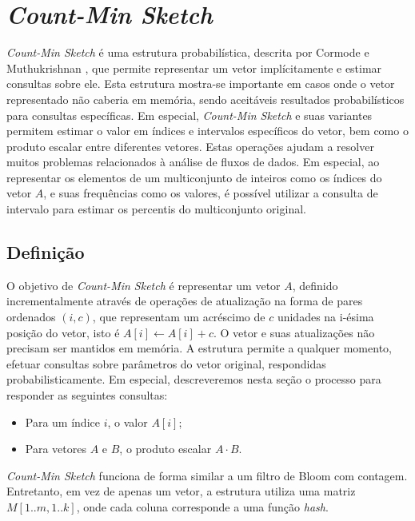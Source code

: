 \section{\emph{Count-Min Sketch}}\label{sec:countmin}

\emph{Count-Min Sketch} é uma estrutura probabilística, descrita por Cormode e Muthukrishnan \cite{cormode2005improved}, que permite representar um vetor implícitamente e estimar consultas sobre ele. Esta estrutura mostra-se importante em casos onde o vetor representado não caberia em memória, sendo aceitáveis resultados probabilísticos para consultas específicas. Em especial, \emph{Count-Min Sketch} e suas variantes permitem estimar o valor em índices e intervalos específicos do vetor, bem como o produto escalar entre diferentes vetores. Estas operações ajudam a resolver muitos problemas relacionados à análise de fluxos de dados. Em especial, ao representar os elementos de um multiconjunto de inteiros como os índices do vetor $A$, e suas frequências como os valores, é possível utilizar a consulta de intervalo para estimar os percentis do multiconjunto original.

\subsection{Definição}


O objetivo de \emph{Count-Min Sketch} é representar um vetor $A$,  definido incrementalmente através de operações de atualização na forma de pares ordenados $(i, c)$, que representam um acréscimo de $c$ unidades na i-ésima posição do vetor, isto é $A[i] \gets A[i] + c$. O vetor e suas atualizações não precisam ser mantidos em memória. A estrutura permite a qualquer momento, efetuar consultas sobre parâmetros do vetor original, respondidas probabilisticamente. Em especial, descreveremos nesta seção o processo para responder as seguintes consultas:

\begin{itemize}
  \item Para um índice $i$, o valor $A[i]$;
  \item Para vetores $A$ e $B$, o produto escalar $A \cdot B$.
\end{itemize}

\emph{Count-Min Sketch} funciona de forma similar a um filtro de Bloom com contagem. Entretanto, em vez de apenas um vetor, a estrutura utiliza uma matriz $M[1..m, 1..k]$, onde cada coluna corresponde a uma função \emph{hash}.

